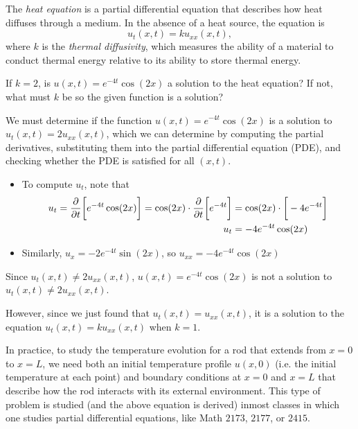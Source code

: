 \documentclass[noauthor,handout]{ximera}
\begin{document}
\begin{problem}
The \emph{heat equation} is a partial differential equation that describes how heat diffuses through a medium.  In the absence of a heat source, the equation is
\[
u_t(x,t) = k u_{xx}(x,t),
\]
where $k$ is the \emph{thermal diffusivity}, which measures the ability of a material to conduct thermal energy relative to its ability to store thermal energy.

If $k=2$, is $u(x,t) = e^{-4t}\cos(2x)$ a solution to the heat equation?  If not, what must $k$ be so the given function is a solution?

\begin{freeResponse}

We must determine if the function $u(x,t) = e^{-4t}\cos(2x)$ is a solution to $u_t(x,t) = 2 u_{xx}(x,t)$, which we can determine by computing the partial derivatives, substituting them into the partial differential equation (PDE), and checking whether the PDE is satisfied for all $(x,t)$.

\begin{itemize}
\item To compute $u_t$, note that 
\begin{align*}
u_t = \frac{\partial }{\partial t} \bigg[ e^{-4t}\cos(2x) \bigg] = \cos(2x) \cdot \frac{\partial }{\partial t} \bigg[ e^{-4t} \bigg] &= \cos(2x) \cdot \bigg[ -4e^{-4t} \bigg] \\
u_t &= -4e^{-4t}\cos(2x)
\end{align*}
\item Similarly,  $u_x = -2e^{-4t}\sin(2x)$, so $u_{xx} =-4e^{-4t}\cos(2x)$
\end{itemize}

Since $u_t(x,t) \neq 2 u_{xx}(x,t)$, $u(x,t) = e^{-4t}\cos(2x)$ is not a solution to $u_t(x,t) \neq 2 u_{xx}(x,t)$.

However, since we just found that $u_t(x,t) = u_{xx}(x,t)$, it is a solution to the equation $u_t(x,t) = k u_{xx}(x,t)$ when $k=1$.

\begin{remark}
In practice, to study the temperature evolution for a rod that extends from $x=0$ to $x=L$, we need both an initial temperature profile $u(x,0)$ (i.e. the initial temperature at each point) and boundary conditions at $x=0$ and $x=L$ that describe how the rod interacts with its external environment.  This type of problem is studied (and the above equation is derived) inmost classes in which one studies partial differential equations, like Math $2173$, $2177$, or $2415$.
\end{remark}

\end{freeResponse}


\end{problem}
\end{document}

